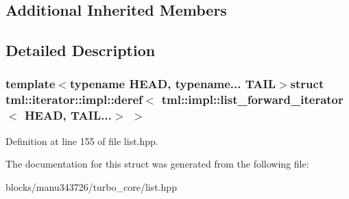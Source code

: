 \subsection*{Additional Inherited Members}


\subsection{Detailed Description}
\subsubsection*{template$<$typename H\+E\+A\+D, typename... T\+A\+I\+L$>$struct tml\+::iterator\+::impl\+::deref$<$ tml\+::impl\+::list\+\_\+forward\+\_\+iterator$<$ H\+E\+A\+D, T\+A\+I\+L...$>$ $>$}



Definition at line 155 of file list.\+hpp.



The documentation for this struct was generated from the following file\+:\begin{DoxyCompactItemize}
\item 
blocks/manu343726/turbo\+\_\+core/list.\+hpp\end{DoxyCompactItemize}
